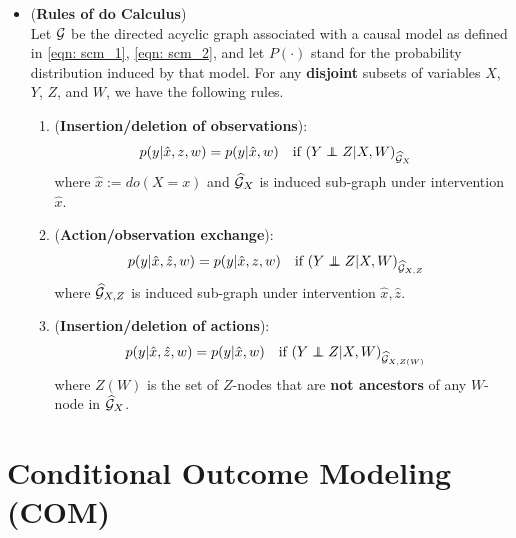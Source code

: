 \documentclass[11pt]{article}
\begin{document}
\begin{itemize}
\item 
\begin{proposition}(\textbf{Rules of do Calculus})\citep{pearl2000causal}  \\
Let ${\mathcal G}$ be the directed acyclic graph associated with a causal model as defined in \eqref{eqn: scm_1}, \eqref{eqn: scm_2}, and let $P(\cdot)$ stand for the probability distribution induced by that model. For any \textbf{disjoint} subsets of variables $X$, $Y$, $Z$, and $W$, we have the following rules.
\begin{enumerate}
\item (\textbf{Insertion/deletion of observations}):
\begin{align}
p(y| \hat{x}, z, w)&= p(y| \hat{x},  w) \quad \text{if }(Y \indep Z | X, W)_{\widehat{\cG}_{X}} \label{eqn: do_del_ob}
\end{align} where $\hat{x} := do(X=x)$ and $\widehat{{\mathcal G}}_{X}$ is induced sub-graph under intervention $\hat{x}$.

\item (\textbf{Action/observation exchange}):
\begin{align}
p(y| \hat{x}, \hat{z}, w)&= p(y| \hat{x}, z, w) \quad \text{if }(Y \indep Z | X, W)_{\widehat{\cG}_{X, Z}}  \label{eqn: do_exch_act_ob}
\end{align} where $\widehat{{\mathcal G}}_{X,Z}$ is induced sub-graph under intervention $\hat{x}, \hat{z}$.

\item  (\textbf{Insertion/deletion of actions}):
\begin{align}
p(y| \hat{x}, \hat{z}, w)&= p(y| \hat{x},  w) \quad \text{if }(Y \indep Z | X, W)_{\widehat{\cG}_{X, Z(W)}} \label{eqn: do_del_act}
\end{align} where $Z(W)$ is the set of $Z$-nodes that are \textbf{not ancestors} of any $W$-node in $\widehat{{\mathcal G}}_{X}$.
\end{enumerate}
\end{proposition}
\end{itemize}

\newpage
\section{Conditional Outcome Modeling (COM)}
\end{document}

